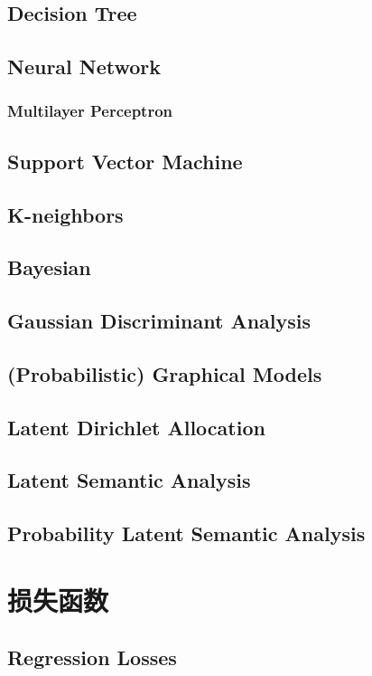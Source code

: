 \documentclass[oneside]{book}
\begin{document}
		\section{Decision Tree}
		\section{Neural Network}
			\subsection{Multilayer Perceptron}
		\section{Support Vector Machine}
		\section{K-neighbors}
		\section{Bayesian}
		\section{Gaussian Discriminant Analysis}
		\section{(Probabilistic) Graphical Models}
		\section{Latent Dirichlet Allocation }
		\section{Latent Semantic Analysis }
		\section{Probability Latent Semantic Analysis }
		
	\chapter{损失函数}
		\section{Regression Losses}
\end{document}
